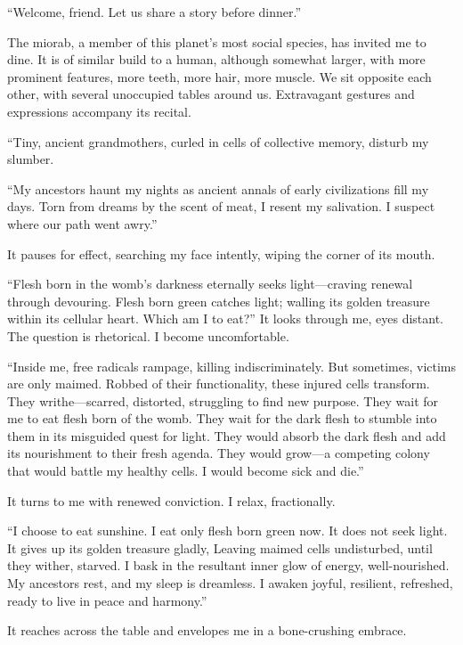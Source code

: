 
``Welcome, friend. Let us share a story before dinner.''

The miorab, a member of this planet's most social species, has invited
me to dine. It is of similar build to a human, although somewhat larger,
with more prominent features, more teeth, more hair, more muscle. We sit
opposite each other, with several unoccupied tables around us.
Extravagant gestures and expressions accompany its recital.

``Tiny, ancient grandmothers, curled in cells of collective memory,
disturb my slumber.

``My ancestors haunt my nights as ancient annals of early civilizations
fill my days. Torn from dreams by the scent of meat, I resent my salivation.
I suspect where our path went awry.''

It pauses for effect, searching my face intently, wiping the corner of
its mouth.

``Flesh born in the womb's darkness eternally seeks light---craving
renewal through devouring.
Flesh born green catches light; walling its golden treasure within its
cellular heart.
Which am I to eat?'' It looks through me, eyes distant. The question is rhetorical. I become
uncomfortable.

``Inside me, free radicals rampage, killing indiscriminately.
But sometimes, victims are only maimed.
Robbed of their functionality, these injured cells transform.
They writhe---scarred, distorted, struggling to find new purpose.
They wait for me to eat flesh born of the womb.
They wait for the dark flesh to stumble into them in its misguided quest
for light.
They would absorb the dark flesh and add its nourishment to their fresh
agenda.
They would grow---a competing colony that would battle my healthy cells.
I would become sick and die.''

It turns to me with renewed conviction. I relax, fractionally.

``I choose to eat sunshine. I eat only flesh born green now.
It does not seek light. It gives up its golden treasure gladly,
Leaving maimed cells undisturbed, until they wither, starved.
I bask in the resultant inner glow of energy, well-nourished.
My ancestors rest, and my sleep is dreamless.
I awaken joyful, resilient, refreshed, ready to live in peace and
harmony.''

It reaches across the table and envelopes me in a bone-crushing embrace.

